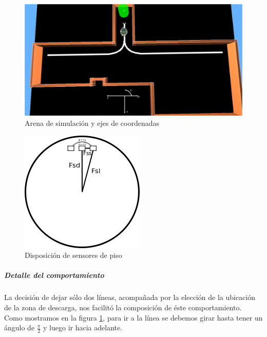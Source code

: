 \begin{figure}[htp]
\begin{center}
\includegraphics[scale=0.3]{comportamientos/arenafinal.png}
\caption{Arena de simulaci\'on y ejes de coordenadas}
\label{fig:arenafinal}
\end{center}
\end{figure}

\begin{figure}[htp]
\begin{center}
\includegraphics[scale=1.0]{comportamientos/floorSensors.png}
\caption{Disposici\'on de sensores de piso}
\label{fig:floorSensors}
\end{center}
\end{figure}

\subparagraph{Detalle del comportamiento}
La decisi\'on de dejar s\'olo dos l\'ineas, acompa\~nada por la elecci\'on de
la ubicaci\'on de la zona de descarga, nos facilit\'o la composici\'on de
\'este comportamiento.
\\ Como mostramos en la figura \ref{fig:arenafinal}, para ir a la l\'inea se
debemos girar hasta tener un \'angulo de $\frac{\pi}{2}$ y luego ir hacia
adelante.


